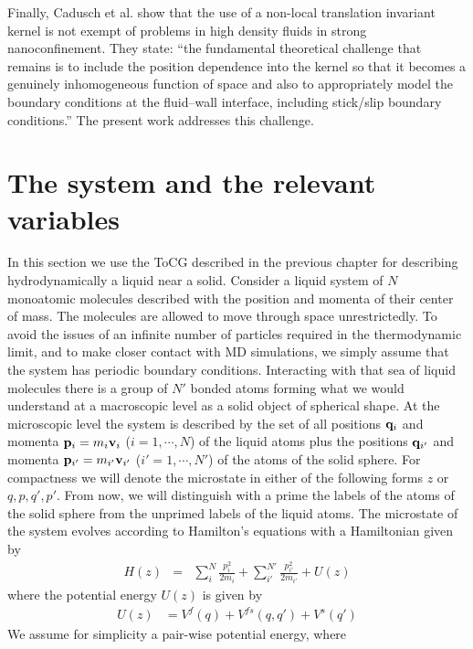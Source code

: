 \documentclass[b5paper,openright,11pt]{book}
\begin{document}
Finally, Cadusch et al.  \cite{Cadusch2008}  show   that  the  use  of  a
non-local translation invariant kernel is not exempt  of problems in high
density fluids in strong nanoconfinement. They state: ``the fundamental
theoretical  challenge  that  remains   is  to  include  the  position
dependence  into   the  kernel   so  that   it  becomes   a  genuinely
inhomogeneous function  of space and  also to appropriately  model the
boundary conditions at the  fluid–wall interface, including stick/slip
boundary conditions.'' The present work addresses this challenge.


\section{The system and the relevant variables}
In this section we use the ToCG described in the previous chapter for describing hydrodynamically a liquid near a solid. 
Consider a liquid system of $N$ monoatomic molecules described
with the position and momenta of  their center of mass.  The molecules
are allowed to move through  space unrestrictedly. To avoid the issues
of  an infinite  number  of particles  required  in the  thermodynamic
limit, and to make closer contact with MD simulations,
we simply  assume that  the system  has periodic  boundary conditions.
Interacting with that sea of liquid molecules there is a group of $N'$
bonded atoms forming  what we would understand at a macroscopic level
as a solid object of spherical shape. 
At the microscopic level the system is described  by the set of all  positions  ${\bf  q}_i$  and  momenta  ${\bf  p}_i=m_i{\bf  v}_i$
($i=1,\cdots,N$) of the liquid atoms plus the positions ${\bf q}_{i'}$
and  momenta ${\bf  p}_{i'}=m_{i'}{\bf v}_{i'}$  ($i'=1,\cdots,N'$) of
the atoms  of the solid  sphere.  For  compactness we will  denote the
microstate in either  of the following forms $z$  or ${q,p,q',p'}$. From now, we
will distinguish  with a prime  the labels of  the atoms of  the solid
sphere from the  unprimed labels of the liquid  atoms.  The microstate
of  the  system  evolves  according to  Hamilton's  equations  with  a
Hamiltonian given by
\begin{eqnarray}
H(z) &=& \sum^N_i \frac{p_i^2}{2m_i} + \sum^{N'}_{i'} \frac{p_{i'}^2}{2m_{i'}}
+ U(z)
\label{H}
\end{eqnarray}
where the potential energy $U(z)$ is given by
\begin{align}
U(z)&=  V^{f}(q)+ V^{fs}(q,q')+ V^{s}(q')
\end{align}
We  assume   for  simplicity  a  pair-wise   potential  energy,  where
\end{document}
